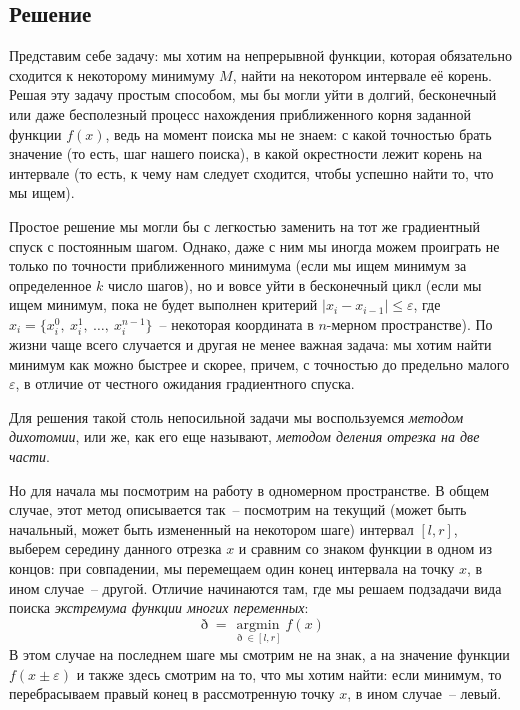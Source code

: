 \documentclass[12pt, a4paper, oneside]{article}
\begin{document}
	\subsection*{Решение}
	Представим себе задачу: мы хотим на непрерывной функции, которая обязательно сходится к некоторому минимуму $M$, найти на некотором интервале её корень. Решая эту задачу простым способом, мы бы могли уйти в долгий, бесконечный или даже бесполезный процесс нахождения приближенного корня заданной функции $f(x)$, ведь на момент поиска мы не знаем: с какой точностью брать значение (то есть, шаг нашего поиска), в какой окрестности лежит корень на интервале (то есть, к чему нам следует сходится, чтобы успешно найти то, что мы ищем).

	Простое решение мы могли бы с легкостью заменить на тот же градиентный спуск с постоянным шагом. Однако, даже с ним мы иногда можем проиграть не только по точности приближенного минимума (если мы ищем минимум за определенное $k$ число шагов), но и вовсе уйти в бесконечный цикл (если мы ищем минимум, пока не будет выполнен критерий $|x_{i} - x_{i - 1}| \leqslant \varepsilon$, где $x_{i} = \{x^0_{i}, ~ x^1_{i}, ~ \ldots, ~ x^{n - 1}_i\}$~-- некоторая координата в $n$-мерном пространстве). По жизни чаще всего случается и другая не менее важная задача: мы хотим найти минимум как можно быстрее и скорее, причем, с точностью до предельно малого $\varepsilon$, в отличие от честного ожидания градиентного спуска.

	Для решения такой столь непосильной задачи мы воспользуемся \textit{методом дихотомии}, или же, как его еще называют, \textit{методом деления отрезка на две части}.

	Но для начала мы посмотрим на работу в одномерном пространстве. В общем случае, этот метод описывается так~-- посмотрим на текущий (может быть начальный, может быть измененный на некотором шаге) интервал $[l, r]$, выберем середину данного отрезка $x$ и сравним со знаком функции в одном из концов: при совпадении, мы перемещаем один конец интервала на точку $x$, в ином случае~-- другой. Отличие начинаются там, где мы решаем подзадачи вида поиска \textit{экстремума функции многих переменных}:
	\[
		\eth = \operatorname*{argmin}_{\eth \in [l, r]}{f(x)}
	\]
	В этом случае на последнем шаге мы смотрим не на знак, а на значение функции $f(x \pm \varepsilon)$ и также здесь смотрим на то, что мы хотим найти: если минимум, то перебрасываем правый конец в рассмотренную точку $x$, в ином случае~-- левый.
\end{document}
